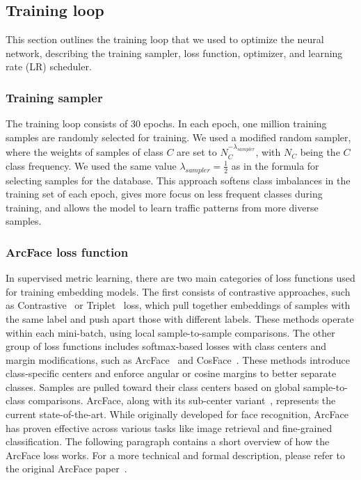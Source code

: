 \documentclass[lettersize,journal,twoside,article]{IEEEtran}
\begin{document}
\subsection{Training loop}
\label{sec:training-loop}
This section outlines the training loop that we used to optimize the neural network, describing the training sampler, loss function, optimizer, and learning rate (LR) scheduler.

\subsubsection{Training sampler}
\label{sec:training-sampler}
The training loop consists of 30 epochs. In each epoch, one million training samples are randomly selected for training. We used a modified random sampler, where the weights of samples of class $C$ are set to $N_{C}^{-\lambda_{sampler}}$, with $N_C$ being the $C$ class frequency. We used the same value $\lambda_{sampler} = \frac{1}{2}$ as in the formula for selecting samples for the database. This approach softens class imbalances in the training set of each epoch, gives more focus on less frequent classes during training, and allows the model to learn traffic patterns from more diverse samples.

\subsubsection{ArcFace loss function}
In supervised metric learning, there are two main categories of loss functions used for training embedding models. The first consists of contrastive approaches, such as Contrastive~\cite{Chopra_2005} or Triplet~\cite{Schroff_2015} loss, which pull together embeddings of samples with the same label and push apart those with different labels. These methods operate within each mini-batch, using local sample-to-sample comparisons. The other group of loss functions includes softmax-based losses with class centers and margin modifications, such as ArcFace~\cite{Deng2019ArcFace} and CosFace~\cite{Wang_2018}. These methods introduce class-specific centers and enforce angular or cosine margins to better separate classes. Samples are pulled toward their class centers based on global sample-to-class comparisons. ArcFace, along with its sub-center variant~\cite{Deng2020Subcenter}, represents the current state-of-the-art. While originally developed for face recognition, ArcFace has proven effective across various tasks like image retrieval and fine-grained classification. The following paragraph contains a short overview of how the ArcFace loss works. For a more technical and formal description, please refer to the original ArcFace paper~\cite{Deng2019ArcFace}.
\end{document}
